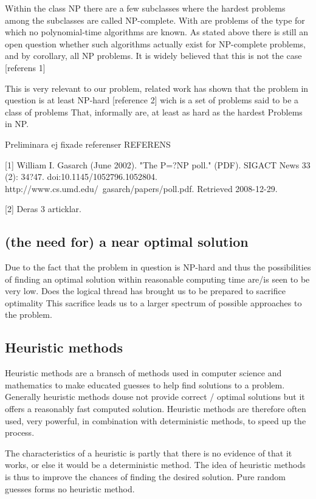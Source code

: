  
Within the class NP there are a few subclasses  where the hardest problems among the subclasses are called NP-complete. With are problems of the type for which no polynomial-time algorithms are known. As stated above there is still an open question whether such algorithms actually exist for NP-complete problems, and by corollary, all NP problems. It is widely believed that this is not the case [referens 1]
 
This is very relevant to our problem, related work has shown that the problem in question is at least NP-hard [reference 2] wich is a set of problems said to be a class of problems That, informally are, at least as hard as the hardest Problems in NP.
 
 
Preliminara ej fixade referenser
REFERENS
 
[1]
William I. Gasarch (June 2002). "The P=?NP poll." (PDF). SIGACT News 33 (2): 34?47. doi:10.1145/1052796.1052804. http://www.cs.umd.edu/~gasarch/papers/poll.pdf. Retrieved 2008-12-29. 
 
[2]
Deras 3 articklar.
 
\subsection{(the need for) a near optimal solution}
 
Due to the fact that the problem in question is NP-hard and thus the possibilities of finding an optimal solution within reasonable computing time are/is seen to be very low. Does the logical thread has brought us to be prepared to sacrifice optimality
This sacrifice leads us to a larger spectrum of possible approaches to the problem.
 
\subsection{Heuristic methods}
 
Heuristic methods are a bransch of methods used in computer science and mathematics to make educated guesses to help find solutions to a problem. Generally heuristic methods douse not provide correct / optimal solutions but it offers a reasonably fast computed solution. Heuristic methods are therefore often used, very powerful, in combination with deterministic methods, to speed up the process.
 
The characteristics of a heuristic is partly that there is no evidence of that it works, or else it would be a deterministic method. The idea of heuristic methods is thus to improve the chances of finding the desired solution. Pure random guesses forms no heuristic method.
 
